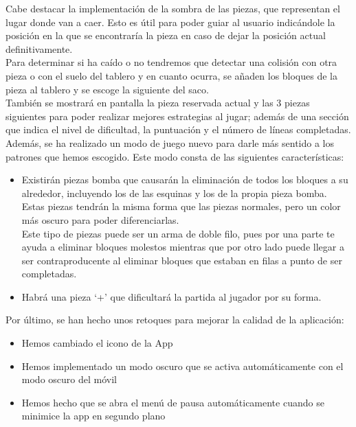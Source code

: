 \documentclass{article}
\begin{document}
Cabe destacar la implementación de la sombra de las piezas, que representan el lugar
donde van a caer. Esto es útil para poder guiar al usuario indicándole la posición
en la que se encontraría la pieza en caso de dejar la posición actual definitivamente.\\

Para determinar si ha caído o no tendremos que detectar una colisión con otra pieza
 o con el suelo del tablero y en cuanto ocurra, se añaden los bloques de la pieza
 al tablero y se escoge la siguiente del saco.\\

También se mostrará en pantalla la pieza reservada actual y las 3 piezas
siguientes para poder realizar mejores estrategias al jugar; además de una
sección que indica el nivel de dificultad, la puntuación y el número de líneas
completadas.\\

Además, se ha realizado un modo de juego nuevo para darle más sentido a los
patrones que hemos escogido. Este modo consta de las siguientes características:

\begin{itemize}
\item Existirán piezas bomba que causarán la eliminación de todos los bloques a su alrededor,
incluyendo los de las esquinas y los de la propia pieza bomba. Estas piezas tendrán la misma forma
que las piezas normales, pero un color más oscuro para poder diferenciarlas.\\
Este tipo de piezas puede ser un arma de doble filo, pues por una parte te ayuda
 a eliminar bloques molestos mientras que por otro lado puede llegar a ser
 contraproducente al eliminar bloques que estaban en filas a punto de ser completadas.
\item Habrá una pieza `+' que dificultará la partida al jugador por su forma.
\end{itemize}

Por último, se han hecho unos retoques para mejorar la calidad de la aplicación:
\begin{itemize}
\item Hemos cambiado el icono de la App
\item Hemos implementado un modo oscuro que se activa automáticamente con el modo oscuro del móvil
\item Hemos hecho que se abra el menú de pausa automáticamente cuando se minimice la app en segundo plano
\end{itemize}
\end{document}
